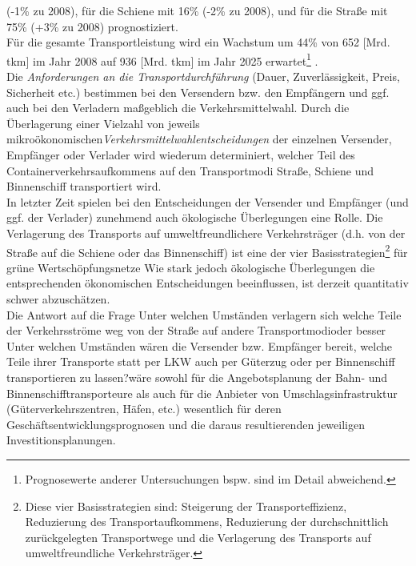 (-1\% zu 2008), für die Schiene mit 16\% (-2\% zu 2008), und für die Straße mit 75\% (+3\% zu 2008) prognostiziert.~\\
Für die gesamte Transportleistung wird ein Wachstum um 44\% von 652 [Mrd. tkm] im Jahr 2008 auf 936 [Mrd. tkm] im Jahr 2025 erwartet\footnote{%
 Prognosewerte anderer Untersuchungen bspw.   sind im Detail abweichend.
}%
.~\\
Die \emph{Anforderungen an die Transportdurchführung} (Dauer, Zuverlässigkeit, Preis, Sicherheit etc.) bestimmen bei den Versendern bzw. den Empfängern und ggf. auch bei den Verladern maßgeblich die Verkehrsmittelwahl. Durch die Überlagerung einer Vielzahl von jeweils \glqq mikroökonomischen\grqq  \emph{Verkehrsmittelwahlentscheidungen} der einzelnen Versender, Empfänger oder Verlader wird wiederum determiniert, welcher Teil des Containerverkehrsaufkommens auf den Transportmodi Straße, Schiene und Binnenschiff transportiert wird.~\\
In letzter Zeit spielen bei den Entscheidungen der Versender und Empfänger (und ggf. der  Verlader) zunehmend auch ökologische Überlegungen eine Rolle. \glqq Die Verlagerung des Transports auf umweltfreundlichere Verkehrsträger (d.h. von der Straße auf die Schiene oder das Binnenschiff) ist eine der vier Basisstrategien\footnote{%
 Diese vier Basisstrategien sind: Steigerung der Transporteffizienz, Reduzierung des Transportaufkommens, Reduzierung der durchschnittlich zurückgelegten Transportwege und die Verlagerung des Transports auf umweltfreundliche Verkehrsträger.
}%
 für grüne Wertschöpfungsnetze\grqq   \autocites[][]{bib.430} Wie stark jedoch ökologische Überlegungen die entsprechenden ökonomischen Entscheidungen beeinflussen, ist derzeit quantitativ schwer abzuschätzen.~\\
Die Antwort auf die Frage \glqq Unter welchen Umständen verlagern sich welche Teile der Verkehrsströme weg von der Straße auf andere Transportmodi\grqq  oder besser \glqq Unter welchen Umständen wären die Versender bzw. Empfänger bereit, welche Teile ihrer Transporte statt per LKW auch per Güterzug oder per Binnenschiff transportieren zu lassen?\grqq  wäre sowohl für die Angebotsplanung der Bahn- und Binnenschifftransporteure als auch für die Anbieter von Umschlagsinfrastruktur (Güterverkehrszentren, Häfen, etc.) wesentlich für deren Geschäftsentwicklungsprognosen und die daraus resultierenden jeweiligen Investitionsplanungen.~\\


% 
